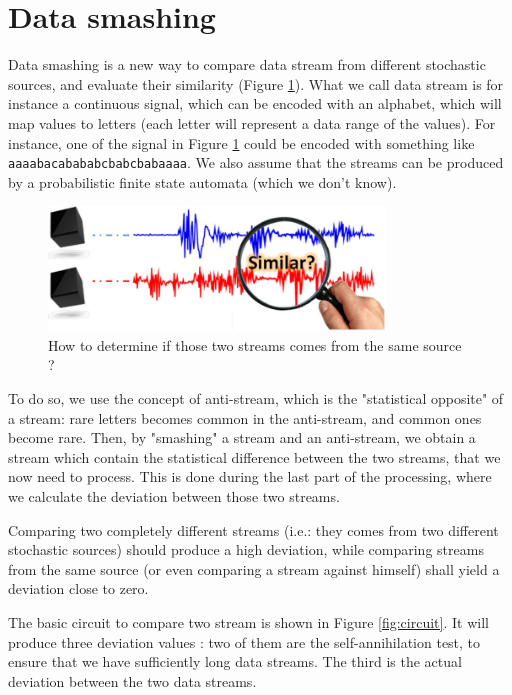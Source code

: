 \section{Data smashing}
	Data smashing\cite{data_smashing} is a new way to compare data stream from different stochastic sources, and evaluate their similarity (Figure \ref{fig:similar}).
	What we call data stream is for instance a continuous signal, which can be encoded with an alphabet, which will map values to letters (each letter will represent a data range of the values). 
	For instance, one of the signal in Figure \ref{fig:similar} could be encoded with something like \verb|aaaabacabababcbabcbabaaaa|.
	We also assume that the streams can be produced by a probabilistic finite state automata (which we don't know).

	\begin{figure}[h]
		\begin{center}
			\includegraphics[width=0.8\textwidth]{figures/similar.png}
		\end{center}
		\caption{How to determine if those two streams comes from the same source ?}
		\label{fig:similar}
	\end{figure}

	To do so, we use the concept of anti-stream, which is the "statistical opposite" of a stream: rare letters becomes common in the anti-stream, and common ones become rare. 
	Then, by "smashing" a stream and an anti-stream, we obtain a stream which contain the statistical difference between the two streams, that we now need to process.
	This is done during the last part of the processing, where we calculate the deviation between those two streams.

	Comparing two completely different streams (i.e.: they comes from two different stochastic sources) should produce a high deviation, while comparing streams from the same source (or even comparing a stream against himself) shall yield a deviation close to zero.

	The basic circuit to compare two stream is shown in Figure \ref{fig:circuit}.
	It will produce three deviation values : two of them are the self-annihilation test, to ensure that we have sufficiently long data streams.
	The third is the actual deviation between the two data streams.

